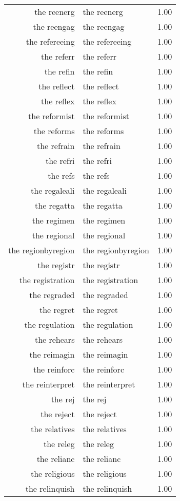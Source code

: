 \begin{table}[ht]
\begin{tabular}{rlr}
  the reenerg & the reenerg & 1.00 \\ 
  the reengag & the reengag & 1.00 \\ 
  the refereeing & the refereeing & 1.00 \\ 
  the referr & the referr & 1.00 \\ 
  the refin & the refin & 1.00 \\ 
  the reflect & the reflect & 1.00 \\ 
  the reflex & the reflex & 1.00 \\ 
  the reformist & the reformist & 1.00 \\ 
  the reforms & the reforms & 1.00 \\ 
  the refrain & the refrain & 1.00 \\ 
  the refri & the refri & 1.00 \\ 
  the refs & the refs & 1.00 \\ 
  the regaleali & the regaleali & 1.00 \\ 
  the regatta & the regatta & 1.00 \\ 
  the regimen & the regimen & 1.00 \\ 
  the regional & the regional & 1.00 \\ 
  the regionbyregion & the regionbyregion & 1.00 \\ 
  the registr & the registr & 1.00 \\ 
  the registration & the registration & 1.00 \\ 
  the regraded & the regraded & 1.00 \\ 
  the regret & the regret & 1.00 \\ 
  the regulation & the regulation & 1.00 \\ 
  the rehears & the rehears & 1.00 \\ 
  the reimagin & the reimagin & 1.00 \\ 
  the reinforc & the reinforc & 1.00 \\ 
  the reinterpret & the reinterpret & 1.00 \\ 
  the rej & the rej & 1.00 \\ 
  the reject & the reject & 1.00 \\ 
  the relatives & the relatives & 1.00 \\ 
  the releg & the releg & 1.00 \\ 
  the relianc & the relianc & 1.00 \\ 
  the religious & the religious & 1.00 \\ 
  the relinquish & the relinquish & 1.00 \\ 

\end{tabular}
\end{table}
